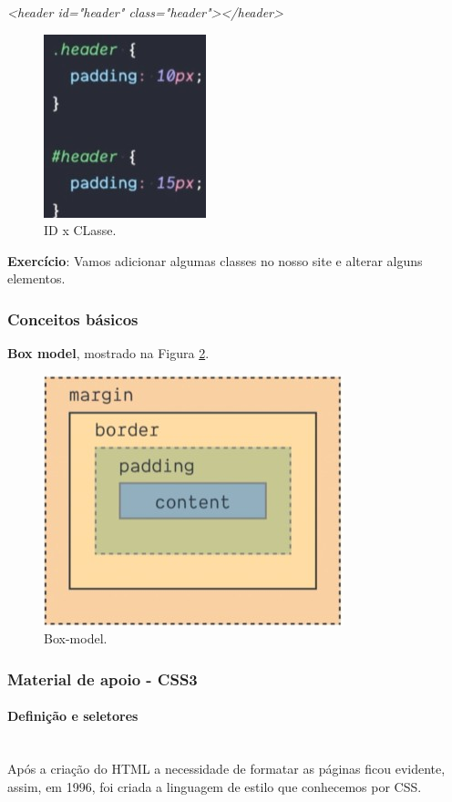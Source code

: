\documentclass[12pt,a4paper]{article}
\begin{document}
	\textit{<header id="header" class="header"></header>}

	\begin{figure}[tbph!]
		\centering
		\includegraphics[width=0.3\linewidth]{images/id-classe}
		\caption{ID x CLasse.}
		\label{fig:id-x-classe}
	\end{figure}

	\textbf{Exercício}: Vamos adicionar algumas classes no nosso site e alterar alguns elementos.
	
	\subsubsection{Conceitos básicos}
	
	\textbf{Box model}, mostrado na Figura \ref{fig:box-model}.
	
	\begin{figure}[tbph!]
		\centering
		\includegraphics[width=0.3\linewidth]{images/box-model}
		\caption{Box-model.}
		\label{fig:box-model}
	\end{figure}
	
	\subsubsection{Material de apoio - CSS3}
	
	\paragraph{Definição e seletores} \mbox{} \\
	
	Após a criação do HTML a necessidade de formatar as páginas ficou evidente, assim, em 1996, foi criada a linguagem de estilo que conhecemos por CSS.
	
\end{document}
